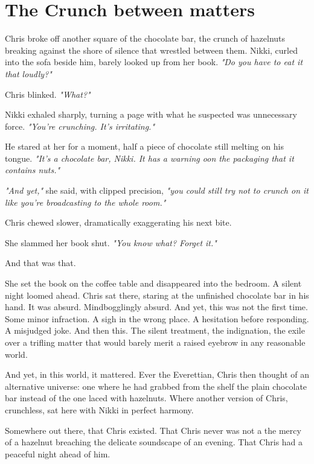 \section*{The Crunch between matters}

Chris broke off another square of the chocolate bar, the crunch of hazelnuts breaking against the shore of silence that wrestled between them.  Nikki, curled into the sofa beside him, barely looked up from her book.  \textit{"Do you have to eat it that loudly?"}  

Chris blinked.  
\textit{"What?"}  

Nikki exhaled sharply, turning a page with what he suspected was unnecessary force.  
\textit{"You're crunching. It's irritating."}  

He stared at her for a moment, half a piece of chocolate still melting on his tongue.  
\textit{"It’s a chocolate bar, Nikki. It has a warning oon the packaging that it contains nuts."}  

\textit{"And yet,"} she said, with clipped precision, \textit{"you could still try not to crunch on it like you're broadcasting to the whole room."}  

Chris chewed slower, dramatically exaggerating his next bite.  

She slammed her book shut.  
\textit{"You know what? Forget it."}  

And that was that.  

She set the book on the coffee table and disappeared into the bedroom. A silent night loomed ahead. Chris sat there, staring at the unfinished chocolate bar in his hand. It was absurd. Mindbogglingly absurd. And yet, this was not the first time.  Some minor infraction. A sigh in the wrong place. A hesitation before responding. A misjudged joke. And then this. The silent treatment, the indignation, the exile over a trifling matter that would barely merit a raised eyebrow in any reasonable world.  

\smallskip
And yet, in this world, it  mattered. Ever the Everettian, Chris then thought of an alternative universe: one where he had grabbed from the shelf the plain chocolate bar instead of the one laced with hazelnuts. Where another version of Chris, crunchless, sat here with Nikki in perfect harmony.  

\smallskip

Somewhere out there, that Chris existed. That Chris never was not a the mercy of a hazelnut breaching the delicate soundscape of an evening. That Chris had a peaceful night ahead of him.  


